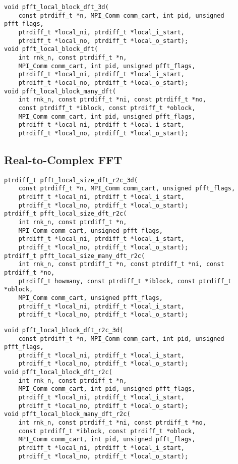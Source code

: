 \begin{lstlisting}
void pfft_local_block_dft_3d(
    const ptrdiff_t *n, MPI_Comm comm_cart, int pid, unsigned pfft_flags,
    ptrdiff_t *local_ni, ptrdiff_t *local_i_start,
    ptrdiff_t *local_no, ptrdiff_t *local_o_start);
void pfft_local_block_dft(
    int rnk_n, const ptrdiff_t *n,
    MPI_Comm comm_cart, int pid, unsigned pfft_flags,
    ptrdiff_t *local_ni, ptrdiff_t *local_i_start,
    ptrdiff_t *local_no, ptrdiff_t *local_o_start);
void pfft_local_block_many_dft(
    int rnk_n, const ptrdiff_t *ni, const ptrdiff_t *no,
    const ptrdiff_t *iblock, const ptrdiff_t *oblock,
    MPI_Comm comm_cart, int pid, unsigned pfft_flags,
    ptrdiff_t *local_ni, ptrdiff_t *local_i_start,
    ptrdiff_t *local_no, ptrdiff_t *local_o_start);
\end{lstlisting}

\subsection{Real-to-Complex FFT}
\begin{lstlisting}
ptrdiff_t pfft_local_size_dft_r2c_3d(
    const ptrdiff_t *n, MPI_Comm comm_cart, unsigned pfft_flags,
    ptrdiff_t *local_ni, ptrdiff_t *local_i_start,
    ptrdiff_t *local_no, ptrdiff_t *local_o_start);
ptrdiff_t pfft_local_size_dft_r2c(
    int rnk_n, const ptrdiff_t *n,
    MPI_Comm comm_cart, unsigned pfft_flags,
    ptrdiff_t *local_ni, ptrdiff_t *local_i_start,
    ptrdiff_t *local_no, ptrdiff_t *local_o_start);
ptrdiff_t pfft_local_size_many_dft_r2c(
    int rnk_n, const ptrdiff_t *n, const ptrdiff_t *ni, const ptrdiff_t *no,
    ptrdiff_t howmany, const ptrdiff_t *iblock, const ptrdiff_t *oblock,
    MPI_Comm comm_cart, unsigned pfft_flags,
    ptrdiff_t *local_ni, ptrdiff_t *local_i_start,
    ptrdiff_t *local_no, ptrdiff_t *local_o_start);
\end{lstlisting}

\begin{lstlisting}
void pfft_local_block_dft_r2c_3d(
    const ptrdiff_t *n, MPI_Comm comm_cart, int pid, unsigned pfft_flags,
    ptrdiff_t *local_ni, ptrdiff_t *local_i_start,
    ptrdiff_t *local_no, ptrdiff_t *local_o_start);
void pfft_local_block_dft_r2c(
    int rnk_n, const ptrdiff_t *n,
    MPI_Comm comm_cart, int pid, unsigned pfft_flags,
    ptrdiff_t *local_ni, ptrdiff_t *local_i_start,
    ptrdiff_t *local_no, ptrdiff_t *local_o_start);
void pfft_local_block_many_dft_r2c(
    int rnk_n, const ptrdiff_t *ni, const ptrdiff_t *no,
    const ptrdiff_t *iblock, const ptrdiff_t *oblock,
    MPI_Comm comm_cart, int pid, unsigned pfft_flags,
    ptrdiff_t *local_ni, ptrdiff_t *local_i_start,
    ptrdiff_t *local_no, ptrdiff_t *local_o_start);
\end{lstlisting}

